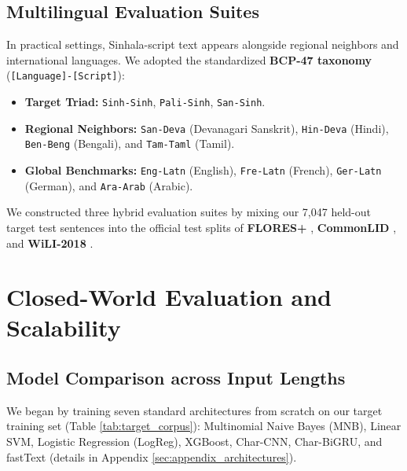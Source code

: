 \documentclass[11pt]{article}
\begin{document}
\subsection{Multilingual Evaluation Suites}
In practical settings, Sinhala-script text appears alongside regional neighbors and international languages. We adopted the standardized \textbf{BCP-47 taxonomy} \cite{phillips2009tags} (\texttt{[Language]-[Script]}):
\begin{itemize}
    \item \textbf{Target Triad:} \texttt{Sinh-Sinh}, \texttt{Pali-Sinh}, \texttt{San-Sinh}.
    \item \textbf{Regional Neighbors:} \texttt{San-Deva} (Devanagari Sanskrit), \texttt{Hin-Deva} (Hindi), \texttt{Ben-Beng} (Bengali), and \texttt{Tam-Taml} (Tamil).
    \item \textbf{Global Benchmarks:} \texttt{Eng-Latn} (English), \texttt{Fre-Latn} (French), \texttt{Ger-Latn} (German), and \texttt{Ara-Arab} (Arabic).
\end{itemize}
We constructed three hybrid evaluation suites by mixing our 7,047 held-out target test sentences into the official test splits of \textbf{FLORES+} \cite{goyal-etal-2022-flores}, \textbf{CommonLID} \cite{suarez-etal-2026-commonlid}, and \textbf{WiLI-2018} \cite{thoma2018wili}.

\section{Closed-World Evaluation and Scalability}
\label{sec:closed_world}

\subsection{Model Comparison across Input Lengths}
We began by training seven standard architectures from scratch on our target training set (Table \ref{tab:target_corpus}): Multinomial Naive Bayes (MNB), Linear SVM, Logistic Regression (LogReg), XGBoost, Char-CNN, Char-BiGRU, and fastText (details in Appendix \ref{sec:appendix_architectures}).
\end{document}
